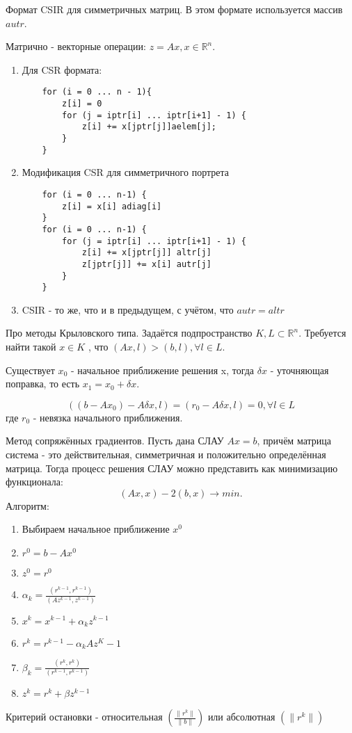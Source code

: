 \documentclass[__main__.tex]{subfiles}
\begin{document}
Формат CSIR для симметричных матриц. В этом формате используется массив $autr$.

Матрично - векторные операции: $z = Ax, x \in \mathbb{R}^n$.

\begin{enumerate}
	\item Для CSR формата:
	      \begin{lstlisting}
	for (i = 0 ... n - 1){
		z[i] = 0
		for (j = iptr[i] ... iptr[i+1] - 1) {
			z[i] += x[jptr[j]]aelem[j];
		}
	}
	\end{lstlisting}

	\item Модификация CSR для симметричного портрета
	      \begin{lstlisting}
	for (i = 0 ... n-1) {
		z[i] = x[i] adiag[i]
	}
	for (i = 0 ... n-1) {
		for (j = iptr[i] ... iptr[i+1] - 1) {
			z[i] += x[jptr[j]] altr[j]
			z[jptr[j]] += x[i] autr[j]
		}
	} 
	\end{lstlisting}

	\item CSIR - то же, что и в предыдущем, с учётом, что $autr = altr$
\end{enumerate}

Про методы Крыловского типа. Задаётся подпространство $K, L \subset \mathbb{R}^n$. Требуется найти такой $x \in K$ , что $\left(Ax, l\right) > \left(b, l\right), \forall l \in L $.

Существует $x_0$ - начальное приближение решения x, тогда $\delta x$ - уточняющая поправка, то есть $x_1 = x_0 + \delta x$.

$$
	\left(\left(b - A x_0\right) - A \delta x, l\right) = \left(r_0 - A\delta x, l\right) = 0, \forall l \in L
$$
где $r_0$ - невязка начального приближения.

Метод сопряжённых градиентов. Пусть дана СЛАУ $Ax = b$, причём матрица система - это действительная, симметричная и положительно определённая  матрица. Тогда процесс решения СЛАУ можно представить как минимизацию функционала: $$\left(Ax, x\right) - 2 \left(b,x\right) \rightarrow min.$$ Алгоритм:

\begin{enumerate}
	\item Выбираем начальное приближение $x^0$

	\item $r^0 = b - Ax^0$

	\item $z^0 = r^0$

	\item $\alpha_k = \frac{\left(r^{k-1}, r^{k - 1}\right)}{\left(Az^{k-1}, z^{k-1}\right)}$

	\item $x^k = x^{k-1} + \alpha_k z^{k-1}$

	\item $r^k = r^{k-1} - \alpha_k A z^K-1$

	\item $\beta_k = \frac{\left(r^k, r^k\right)}{\left(r^{k-1}, r^{k-1}\right)}$

	\item $z^k = r^k + \beta z^{k-1}$
\end{enumerate}

Критерий остановки - относительная $\left(\frac{\| r^k \|}{\| b \|}\right)$ или абсолютная $\left(\| r^k \|\right)$
\end{document}
